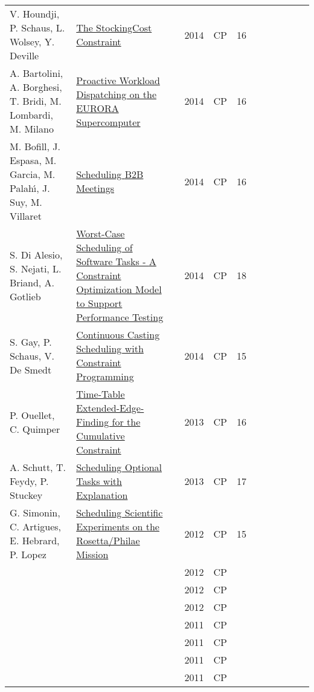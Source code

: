 \documentclass[a4paper]{article}
\begin{document}
{\begin{longtable}{p{3cm}p{6cm}rrcrlcccp{1.5cm}l}
V. Houndji, P. Schaus, L. Wolsey, Y. Deville& \href{papers/HoundjiSWD14.pdf}{The StockingCost Constraint} & \cite{HoundjiSWD14} & 2014 & CP & 16 & & & & & & \\
A. Bartolini, A. Borghesi, T. Bridi, M. Lombardi, M. Milano& \href{papers/BartoliniBBLM14.pdf}{Proactive Workload Dispatching on the {EURORA} Supercomputer} & \cite{BartoliniBBLM14} & 2014 & CP & 16 & & & & & & \\
M. Bofill, J. Espasa, M. Garcia, M. Palah{\'{\i}}, J. Suy, M. Villaret& \href{papers/BofillEGPSV14.pdf}{Scheduling {B2B} Meetings} & \cite{BofillEGPSV14} & 2014 & CP & 16 & & & & & & \\
S. {Di Alesio}, S. Nejati, L. Briand, A. Gotlieb& \href{papers/AlesioNBG14.pdf}{Worst-Case Scheduling of Software Tasks - {A} Constraint Optimization Model to Support Performance Testing} & \cite{AlesioNBG14} & 2014 & CP & 18 & & & & & & \\
S. Gay, P. Schaus, V. De Smedt& \href{papers/GaySS14.pdf}{Continuous Casting Scheduling with Constraint Programming} & \cite{GaySS14} & 2014 & CP & 15 & & & & & & \\
P. Ouellet, C. Quimper& \href{papers/OuelletQ13.pdf}{Time-Table Extended-Edge-Finding for the Cumulative Constraint} & \cite{OuelletQ13} & 2013 & CP & 16 & & & & & & \\
A. Schutt, T. Feydy, P. Stuckey& \href{papers/SchuttFS13.pdf}{Scheduling Optional Tasks with Explanation} & \cite{SchuttFS13} & 2013 & CP & 17 & & & & & & \\
G. Simonin, C. Artigues, E. Hebrard, P. Lopez& \href{papers/SimoninAHL12.pdf}{Scheduling Scientific Experiments on the Rosetta/Philae Mission} & \cite{SimoninAHL12} & 2012 & CP & 15 & & & & & & \\
& \href{papers/LetortBC12.pdf}{} & \cite{LetortBC12} & 2012 & CP & & & & & & & \\
& \href{papers/SerraNM12.pdf}{} & \cite{SerraNM12} & 2012 & CP & & & & & & & \\
& \href{papers/IfrimOS12.pdf}{} & \cite{IfrimOS12} & 2012 & CP & & & & & & & \\
& \href{papers/HermenierDL11.pdf}{} & \cite{HermenierDL11} & 2011 & CP & & & & & & & \\
& \href{papers/BonfiettiLBM11.pdf}{} & \cite{BonfiettiLBM11} & 2011 & CP & & & & & & & \\
& \href{papers/ClercqPBJ11.pdf}{} & \cite{ClercqPBJ11} & 2011 & CP & & & & & & & \\
& \href{papers/GrimesH11.pdf}{} & \cite{GrimesH11} & 2011 & CP & & & & & & & \\

\end{longtable}}
\end{document}
